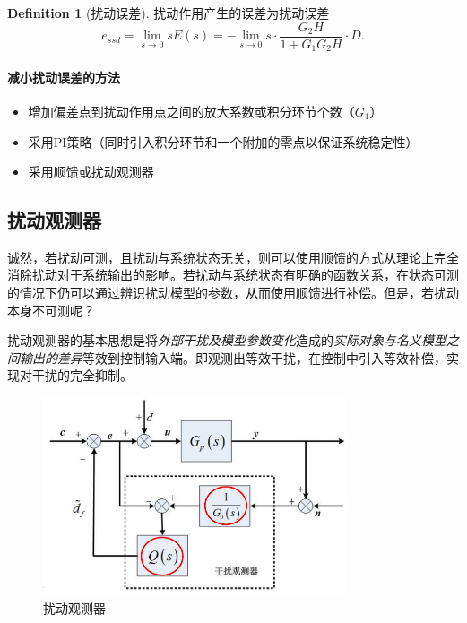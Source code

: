 \documentclass[14pt,a4paper]{article}
\theoremstyle{plain}
\theoremstyle{definition}
\newtheorem*{dfn}{Definition}
\theoremstyle{remark}
\theoremstyle{plain}
\theoremstyle{plain}
\theoremstyle{definition}
\begin{document}
			\begin{dfn}[扰动误差]  
			\label{dfn:扰动误差}
				扰动作用产生的误差为扰动误差
				\[
					e_\textit{ssd}  = \lim_{s \to 0} sE(s) = - \lim_{s \to 0} s\cdot \dfrac{G_2 H}{1+G_1 G_2 H}\cdot D 
				.\] 
			\end{dfn} 

			\paragraph{减小扰动误差的方法}%
			\label{par:减小扰动误差的方法}
			
				\begin{itemize}
					\item 增加偏差点到扰动作用点之间的放大系数或积分环节个数（$G_1$） 
					\item 采用PI策略（同时引入积分环节和一个附加的零点以保证系统稳定性） 
					\item 采用顺馈或扰动观测器
				\end{itemize} 

		\subsection{扰动观测器}%
		\label{sub:扰动观测器}
		
			诚然，若扰动可测，且扰动与系统状态无关，则可以使用顺馈的方式从理论上完全消除扰动对于系统输出的影响。若扰动与系统状态有明确的函数关系，在状态可测的情况下仍可以通过辨识扰动模型的参数，从而使用顺馈进行补偿。但是，若扰动本身不可测呢？

			扰动观测器的基本思想是将\emph{外部干扰及模型参数变化}造成的\emph{实际对象与名义模型之间输出的差异}等效到控制输入端。即观测出等效干扰，在控制中引入等效补偿，实现对干扰的完全抑制。

			\begin{figure}[H]
				\centering
				\includegraphics[width=0.8\textwidth]{./figures/disturbance_observer.jpg} 
				\caption{扰动观测器}
				\label{fig:disturbance-observer}
			\end{figure} 
\end{document}
